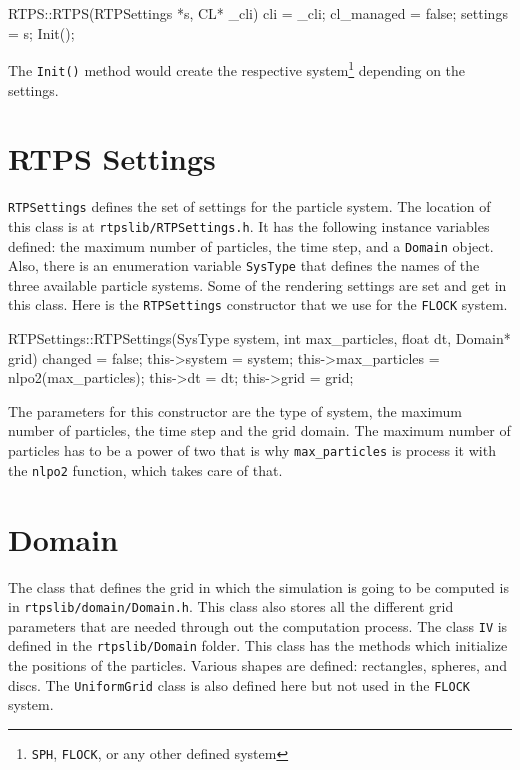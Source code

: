 \begin{cppcode}{0}
RTPS::RTPS(RTPSettings *s, CL* _cli) 
{
	cli = _cli;
 	cl_managed = false;
	settings = s;
	Init();
}
\end{cppcode}

The \texttt{Init()} method would create the respective system\footnote{\texttt{SPH}, \texttt{FLOCK}, or any other defined system} depending on the settings.

\section{RTPS Settings}
\texttt{RTPSettings} defines the set of settings for the particle system. The location of this class is at \texttt{rtpslib/RTPSettings.h}. It has the following instance variables defined: the maximum number of particles, the time step, and a \texttt{Domain} object. Also, there is an enumeration variable \texttt{SysType} that defines the names of the three available particle systems. Some of the rendering settings are set and get in this class. Here is the \texttt{RTPSettings} constructor that we use for the \texttt{FLOCK} system.

\begin{cppcode}{0}
RTPSettings::RTPSettings(SysType system, int max_particles, float dt, Domain* grid)
{
	changed = false;
	this->system = system;
	this->max_particles = nlpo2(max_particles);
	this->dt = dt;
	this->grid = grid;
}
\end{cppcode}

The parameters for this constructor are the type of system, the maximum number of particles, the time step and the grid domain. The maximum number of particles has to be a power of two that is why \texttt{max\_particles} is process it with the \texttt{nlpo2} function, which takes care of that.

\section{Domain}
The class that defines the grid in which the simulation is going to be computed is in \texttt{rtpslib/domain/Domain.h}. This class also stores all the different grid parameters that are needed through out the computation process. The class \texttt{IV} is defined in the \texttt{rtpslib/Domain} folder. This class has the methods which initialize the positions of the particles. Various shapes are defined: rectangles, spheres, and discs. The \texttt{UniformGrid} class is also defined here but not used in the \texttt{FLOCK} system.

